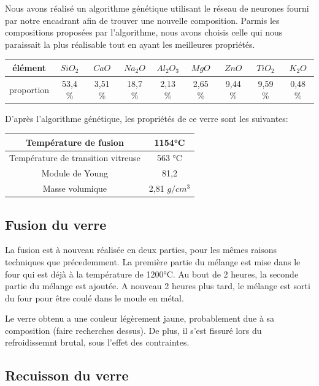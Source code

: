 \documentclass{article}
\begin{document}
Nous avons réalisé un algorithme génétique utilisant le réseau de neurones fourni par notre encadrant afin de trouver une nouvelle composition. 
Parmis les compositions proposées par l'algorithme, nous avons choisis celle qui nous paraissait la plus réalisable tout en ayant les meilleures propriétés.

\begin{table}[h!]
    \centering
    \begin{tabular}{|c|c|c|c|c|c|c|c|c|}
        \hline
        élément &  $SiO_2$ & $CaO$ & $Na_2O$ & $Al_2O_3$ & $MgO$ & $ZnO$ & $TiO_2$ & $K_2O$ \\
        \hline
        proportion & 53,4 \% & 3,51 \% & 18,7 \% & 2,13 \% & 2,65 \% & 9,44 \% & 9,59 \% & 0,48 \%\\
        \hline
        \end{tabular} 
    \end{table}
D'après l'algorithme génétique, les propriétés de ce verre sont les suivantes:

\begin{table}[h!]
    \centering
\begin{tabular}{|c|c|}
    \hline
    Température de fusion & 1154°C \\
    \hline
    Température de transition vitreuse & 563 °C \\
    \hline
    Module de Young & 81,2 \\
    \hline
    Masse volumique & 2,81 $g/cm^{3}$ \\
    \hline
    \end{tabular} 
\end{table}

\subsection{Fusion du verre}

La fusion est à nouveau réalisée en deux parties, pour les mêmes raisons techniques que précedemment.
La première partie du mélange est mise dans le four qui est déjà à la température de 1200°C. Au bout de 2 heures, la seconde partie du mélange est ajoutée. A nouveau 2 heures plus tard, le mélange est sorti du four pour être coulé dans le moule en métal.

Le verre obtenu a une couleur légèrement jaune, probablement due à sa composition (faire recherches dessus). De plus, il s'est fissuré lors du refroidissemnt brutal, sous l'effet des contraintes.
\subsection{Recuisson du verre }
\end{document}
